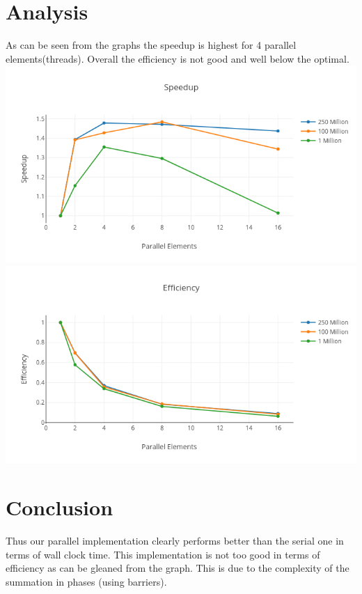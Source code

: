 \documentclass[12pt,a4paper]{article}
\begin{document}
\section{Analysis}
As can be seen from the graphs the speedup is highest for 4 parallel elements(threads). Overall the efficiency is not good and well below the optimal.
\includegraphics[scale=0.54]{spd}\\
\includegraphics[scale=0.54]{eff}
\section{Conclusion}
Thus our parallel implementation clearly performs better than the serial one in terms of wall clock time. This implementation is not too good in terms of efficiency as can be gleaned from the graph. This is due to the complexity of the summation in phases (using barriers).
\end{document}
